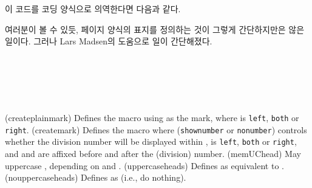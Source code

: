 이 코드를  코딩 양식으로 의역한다면 다음과 같다.
\begin{lcode}
\end{lcode}
여러분이 볼 수 있듯, 페이지 양식의 표지를 정의하는 것이 그렇게 간단하지만은
않은 일이다.
그러나 Lars Madsen의 도움으로 일이 간단해졌다.

\begin{syntax}
\cmd{\createplainmark} \\
\cmd{\memUChead} \\
\cmd{\uppercaseheads} \cmd{\nouppercaseheads} \\
\cmd{\createmark} \\
\end{syntax}
\glossary(createplainmark)%
  {}%
  {Defines the  macro using  as the mark, where
   is \texttt{left}, \texttt{both} or \texttt{right}.}
\glossary(createmark)%
  {}%
  {Defines the  macro where  (\texttt{shownumber} 
   or \texttt{nonumber}) controls whether the division number will be
   displayed within ,  is \texttt{left}, 
   \texttt{both} or \texttt{right}, and  and 
   are affixed before and after the  (division) number.}
\glossary(memUChead)%
  {}%
  {May uppercase , depending on  and
  .}
\glossary(uppercaseheads)%
  {}%
  {Defines  as equivalent to .}
\glossary(nouppercaseheads)%
  {}%
  {Defines  as  (i.e., do nothing).}


